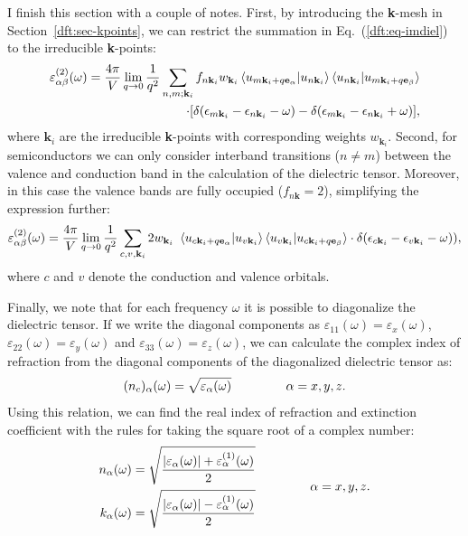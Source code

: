 \begin{refsection}
I finish this section with a couple of notes. First, by introducing the 
\textbf{k}-mesh in Section~\ref{dft:sec-kpoints}, we can restrict the 
summation in Eq.~(\ref{dft:eq-imdiel}) to the irreducible \textbf{k}-points: 
\begin{align*} 
\varepsilon_{\alpha \beta}^{(2)} (\omega) = \frac{4\pi}{V} \lim_{q 
\rightarrow 0} \frac{1}{q^2} \sum_{n,m;\mathbf{k}_i}  f_{n\mathbf{k}_i} w_{\mathbf{k}_i} 
\braket{u_{m\mathbf{k}_i+q\mathbf{e}_\alpha}|u_{n\mathbf{k}_i}} 
\braket{u_{n\mathbf{k}_i}|u_{m\mathbf{k}_i+q\mathbf{e}_\beta}} \\  
\cdot [\delta(\epsilon_{m\mathbf{k}_i}-\epsilon_{n\mathbf{k}_i}-\omega) - 
\delta(\epsilon_{m\mathbf{k}_i}-\epsilon_{n\mathbf{k}_i}+\omega)], 
\end{align*} 
where $\mathbf{k}_i$ are the irreducible \textbf{k}-points with corresponding 
weights $w_{\mathbf{k}_i}$. Second, for semiconductors we can only consider 
interband transitions ($n \neq m$) between the valence and conduction band in the 
calculation of the dielectric tensor. Moreover, in this case the valence bands 
are fully occupied ($f_{n\mathbf{k}} = 2$), simplifying the expression 
further: 
\begin{equation} 
\varepsilon_{\alpha \beta}^{(2)} (\omega) = \frac{4\pi}{V} \lim_{q 
\rightarrow 0} \frac{1}{q^2} \sum_{c,v,\mathbf{k}_i} 2 w_{\mathbf{k}_i} \ 
\braket{u_{c\mathbf{k}_i+q\mathbf{e}_\alpha}|u_{v\mathbf{k}_i}} 
\braket{u_{v\mathbf{k}_i}|u_{c\mathbf{k}_i+q\mathbf{e}_\beta}} \cdot 
\delta(\epsilon_{c\mathbf{k}_i}-\epsilon_{v\mathbf{k}_i}-\omega)), 
\end{equation} 
where $c$ and $v$ denote the conduction and valence orbitals. 
 
Finally, we note that for each frequency $\omega$ it is possible to 
diagonalize the dielectric tensor. If we write the diagonal components as 
$\varepsilon_{11}(\omega) = \varepsilon_{x}(\omega)$, 
$\varepsilon_{22}(\omega) = \varepsilon_{y}(\omega)$ and 
$\varepsilon_{33}(\omega) = \varepsilon_{z}(\omega)$, we can calculate the 
complex index of refraction from the diagonal components of the diagonalized dielectric 
tensor as: 
\begin{equation} 
(n_c)_{\alpha}(\omega) = \sqrt{\varepsilon_{\alpha}(\omega)} \hspace{0.6in} 
\alpha = x,y,z. 
\end{equation} 
Using this relation, we can find the real index of refraction and extinction 
coefficient with the rules for taking the square root of a complex number: 
\begin{equation}\label{dft:eq-refindex} 
\begin{aligned} 
n_\alpha(\omega) = \sqrt{\frac{| \varepsilon_\alpha (\omega) | + 
\varepsilon_\alpha^{(1)}(\omega)}{2}} \\ 
k_\alpha(\omega) = \sqrt{\frac{| \varepsilon_\alpha (\omega) | - 
\varepsilon_\alpha^{(1)}(\omega)}{2}} 
\end{aligned}\hspace{0.6in} \alpha = x,y,z. 
\end{equation} 


\end{refsection}
